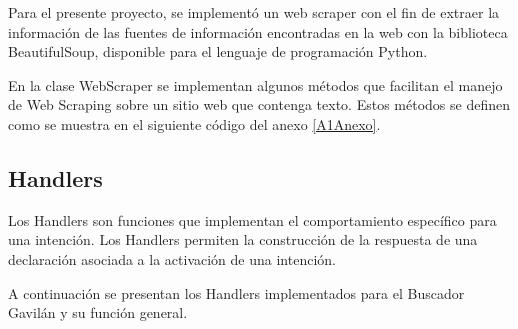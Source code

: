 Para el presente proyecto, se implementó un web scraper con el fin de extraer la información de las fuentes de información encontradas en la web con la biblioteca BeautifulSoup, disponible para el lenguaje de programación Python.

En la clase WebScraper se implementan algunos métodos que facilitan el manejo de Web Scraping sobre un sitio web que contenga texto. Estos métodos se definen como se muestra en el siguiente código del anexo \ref{A1Anexo}.


\subsection{Handlers}
\label{HandlerscapIV}

Los Handlers son funciones que implementan el comportamiento específico para una intención. Los Handlers permiten la construcción de la respuesta de una declaración asociada a la activación de una intención.

A continuación se presentan los Handlers implementados para el Buscador Gavilán y su función general.

